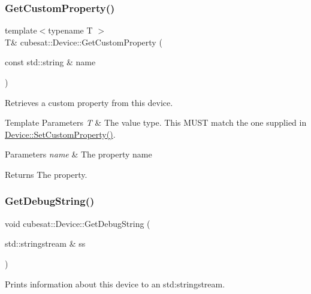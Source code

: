 \subsubsection{\texorpdfstring{Get\+Custom\+Property()}{GetCustomProperty()}}
{\footnotesize\ttfamily template$<$typename T $>$ \\
T\& cubesat\+::\+Device\+::\+Get\+Custom\+Property (\begin{DoxyParamCaption}\item[{const std\+::string \&}]{name }\end{DoxyParamCaption})\hspace{0.3cm}{\ttfamily [inline]}}



Retrieves a custom property from this device. 


\begin{DoxyTemplParams}{Template Parameters}
{\em T} & The value type. This M\+U\+ST match the one supplied in \hyperlink{classcubesat_1_1Device_a586d450c984461a04503e895758cafcb}{Device\+::\+Set\+Custom\+Property()}. \\
\hline
\end{DoxyTemplParams}

\begin{DoxyParams}{Parameters}
{\em name} & The property name \\
\hline
\end{DoxyParams}
\begin{DoxyReturn}{Returns}
The property. 
\end{DoxyReturn}
\mbox{\label{classcubesat_1_1Device_a2bc1682e91b0e2cce693bd7f2f88f052}} 
\subsubsection{\texorpdfstring{Get\+Debug\+String()}{GetDebugString()}}
{\footnotesize\ttfamily void cubesat\+::\+Device\+::\+Get\+Debug\+String (\begin{DoxyParamCaption}\item[{std\+::stringstream \&}]{ss }\end{DoxyParamCaption})\hspace{0.3cm}{\ttfamily [inline]}}



Prints information about this device to an std\+:stringstream. 


